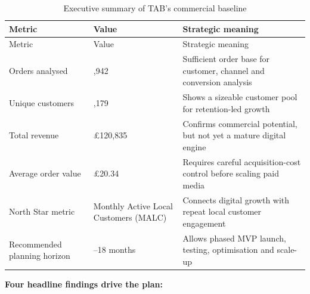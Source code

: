 \documentclass[
  11pt,
]{article}
\begin{document}
\begin{longtable}[]{@{}
  >{\raggedright\arraybackslash}p{}
  >{\raggedright\arraybackslash}p{}
  >{\raggedright\arraybackslash}p{}@{}}
\caption{Executive summary of TAB's commercial baseline}\tabularnewline
\toprule\noalign{}
\begin{minipage}[b]{\linewidth}\raggedright
Metric
\end{minipage} & \begin{minipage}[b]{\linewidth}\raggedright
Value
\end{minipage} & \begin{minipage}[b]{\linewidth}\raggedright
Strategic meaning
\end{minipage} \\
\midrule\noalign{}
\endfirsthead
\toprule\noalign{}
\begin{minipage}[b]{\linewidth}\raggedright
Metric
\end{minipage} & \begin{minipage}[b]{\linewidth}\raggedright
Value
\end{minipage} & \begin{minipage}[b]{\linewidth}\raggedright
Strategic meaning
\end{minipage} \\
\midrule\noalign{}
\endhead
\bottomrule\noalign{}
\endlastfoot
Orders analysed & 5,942 & Sufficient order base for customer, channel
and conversion analysis \\
Unique customers & 4,179 & Shows a sizeable customer pool for
retention-led growth \\
Total revenue & £120,835 & Confirms commercial potential, but not yet a
mature digital engine \\
Average order value & £20.34 & Requires careful acquisition-cost control
before scaling paid media \\
North Star metric & Monthly Active Local Customers (MALC) & Connects
digital growth with repeat local customer engagement \\
Recommended planning horizon & 12--18 months & Allows phased MVP launch,
testing, optimisation and scale-up \\
\end{longtable}

\textbf{Four headline findings drive the plan:}
\end{document}
